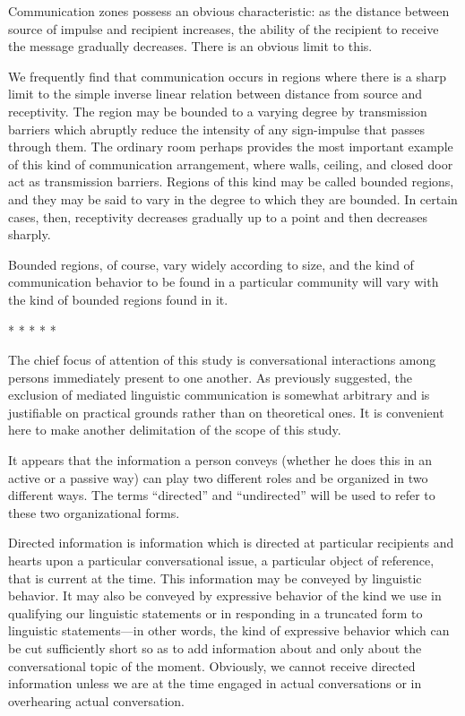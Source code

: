 \documentclass[openany,nobib]{tufte-book}
\begin{document}
Communication zones possess an obvious characteristic: as the distance
between source of impulse and recipient increases, the ability of the
recipient to receive the message gradually decreases. There is an
obvious limit to this.

We frequently find that communication occurs in regions where there is a
sharp limit to the simple inverse linear relation between distance from
source and receptivity. The region may be bounded to a varying degree by
transmission barriers which abruptly reduce the intensity of any
sign-impulse that passes through them. The ordinary room perhaps
provides the most important example of this kind of communication
arrangement, where walls, ceiling, and closed door act as transmission
barriers. Regions of this kind may be called bounded regions, and they
may be said to vary in the degree to which they are bounded. In certain
cases, then, receptivity decreases gradually up to a point and then
decreases sharply.

Bounded regions, of course, vary widely according to size, and the kind
of communication behavior to be found in a particular community will
vary with the kind of bounded regions found in it.

\vspace{.2in}
\begin{centering}

\Large{* * * * *}

\end{centering}
\vspace{.17in}

\noindent The chief focus of attention of this study is conversational
interactions among persons immediately present to one another. As
previously suggested, the exclusion of mediated linguistic communication
is somewhat arbitrary and is justifiable on practical grounds rather
than on theoretical ones. It is convenient here to make another
delimitation of the scope of this study.

It appears that the information a person conveys (whether he does this
in an active or a passive way) can play two different roles and be
organized in two different ways. The terms ``directed'' and
``undirected'' will be used to refer to these two organizational forms.

Directed information is information which is directed at particular
recipients and hearts upon a particular conversational issue, a
particular object of reference, that is current at the time. This
information may be conveyed by linguistic behavior. It may also be
conveyed by expressive behavior of the kind we use in qualifying our
linguistic statements or in responding in a truncated form to linguistic
statements---in other words, the kind of expressive behavior which can
be cut sufficiently short so as to add information about and only about
the conversational topic of the moment. Obviously, we cannot receive
directed information unless we are at the time engaged in actual
conversations or in overhearing actual conversation.
\end{document}
